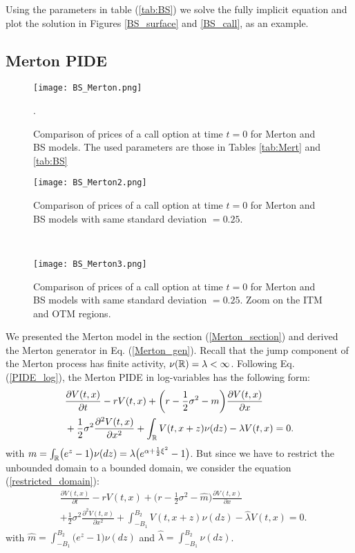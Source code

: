 Using the parameters in table (\ref{tab:BS}) we solve the fully implicit equation and plot the solution in Figures \ref{BS_surface} and \ref{BS_call}, as an example.



\subsection{Merton PIDE}

\begin{figure}[t]
   \centering
   \texttt{[image: BS\_Merton.png]}
   \caption{Comparison of prices of a call option at time $t=0$ for Merton and BS models. The used parameters are those in Tables \ref{tab:Mert} and \ref{tab:BS}}.
   \label{BS_Merton}
\end{figure}  
\begin{figure}[t]
   \centering
   \texttt{[image: BS\_Merton2.png]}
   \caption{Comparison of prices of a call option at time $t=0$ for Merton and BS models with same standard deviation $=0.25$.}
   \label{BS_Merton2} 
 \end{figure}
 \ \hspace{2mm} \hspace{3mm} \
 \begin{figure}[t]
   \texttt{[image: BS\_Merton3.png]}
   \caption{Comparison of prices of a call option at time $t=0$ for Merton and BS models with same standard deviation $=0.25$. Zoom on the ITM and OTM regions.}
   \label{BS_Merton3}
\end{figure}
We presented the Merton model in the section (\ref{Merton_section}) and derived the Merton generator in Eq. (\ref{Merton_gen}). 
Recall that the jump component of the Merton process has finite activity, $\nu(\mathbb{R}) = \lambda < \infty$.
Following Eq. (\ref{PIDE_log}), the Merton PIDE in log-variables has the following form: 
\begin{align}\label{Merton_PIDE}
&  \frac{\partial V(t,x)}{\partial t} - r V(t,x) 
          + \biggl( r -\frac{1}{2}\sigma^2 -m \biggr) \frac{\partial V(t,x)}{\partial x} \\ \nonumber
          &+ \frac{1}{2} \sigma^2 \frac{\partial^2 V(t,x)}{\partial x^2} 
          + \int_{\mathbb{R}} V(t,x+z) \nu(dz) - \lambda V(t,x)  = 0.
\end{align}
with $m = \int_{\mathbb{R}} \bigl( e^z-1 \bigr) \nu(dz) = \lambda \bigl( e^{\alpha + \frac{1}{2} \xi^2} -1 \bigr)$. 
But since we have to restrict the unbounded domain to a bounded domain, we consider the equation (\ref{restricted_domain}):
\begin{align*}
&  \frac{\partial V(t,x)}{\partial t} - r V(t,x) 
          + \biggl( r -\frac{1}{2}\sigma^2 - \hat m \biggr) \frac{\partial V(t,x)}{\partial x} \\
          &+ \frac{1}{2} \sigma^2 \frac{\partial^2 V(t,x)}{\partial x^2} 
          + \int_{-B_1}^{B_2} V(t,x+z) \nu(dz) - \hat \lambda V(t,x)  = 0.
\end{align*}
with $\hat m = \int_{-B_1}^{B_2} \bigl( e^z-1 \bigr) \nu(dz)$ and $\hat \lambda = \int_{-B_1}^{B_2} \nu(dz)$.

